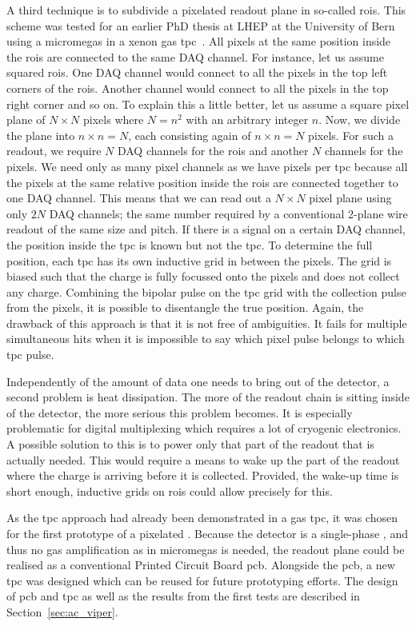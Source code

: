 A third technique is to subdivide a pixelated readout plane in so-called \glspl{roi}.
This scheme was tested for an earlier PhD thesis at LHEP at the University of Bern using a \gls{micromegas} in a xenon gas \gls{tpc}~\cite{maplesyrup}.
All pixels at the same position inside the \glspl{roi} are connected to the same DAQ channel.
For instance, let us assume squared \glspl{roi}.
One DAQ channel would connect to all the pixels in the top left corners of the \glspl{roi}.
Another channel would connect to all the pixels in the top right corner and so on.
To explain this a little better, let us assume a square pixel plane of $N \times N$ pixels where $N = n ^ 2$ with an arbitrary integer $n$.
Now, we divide the plane into $n \times n = N$, each consisting again of $n \times n = N$ pixels.
For such a readout, we require $N$ DAQ channels for the \glspl{roi} and another $N$ channels for the pixels.
We need only as many pixel channels as we have pixels per tpc because all the pixels at the same relative position inside the \glspl{roi} are connected together to one DAQ channel.
This means that we can read out a $N \times N$ pixel plane using only $2 N$ DAQ channels; the same number required by a conventional 2-plane wire readout of the same size and pitch.
If there is a signal on a certain DAQ channel, the position inside the tpc is known but not the tpc.
To determine the full position, each tpc has its own inductive grid in between the pixels.
The grid is biased such that the charge is fully focussed onto the pixels and does not collect any charge.
Combining the bipolar pulse on the tpc grid with the collection pulse from the pixels, it is possible to disentangle the true position.
Again, the drawback of this approach is that it is not free of ambiguities.
It fails for multiple simultaneous hits when it is impossible to say which pixel pulse belongs to which tpc pulse.

Independently of the amount of data one needs to bring out of the detector, a second problem is heat dissipation.
The more of the readout chain is sitting inside of the detector, the more serious this problem becomes.
It is especially problematic for digital multiplexing which requires a lot of cryogenic electronics.
A possible solution to this is to power only that part of the readout that is actually needed.
This would require a means to wake up the part of the readout where the charge is arriving before it is collected.
Provided, the wake-up time is short enough, inductive grids on \glspl{roi} could allow precisely for this.

As the tpc approach had already been demonstrated in a gas \gls{tpc}, it was chosen for the first prototype of a pixelated \lartpc{}.
Because the detector is a single-phase \lartpc{}, and thus no gas amplification as in \gls{micromegas} is needed, the readout plane could be realised as a conventional Printed Circuit Board \gls{pcb}.
Alongside the \gls{pcb}, a new \gls{tpc} was designed which can be reused for future prototyping efforts.
The design of \gls{pcb} and \gls{tpc} as well as the results from the first tests are described in Section~\ref{sec:ac_viper}.
